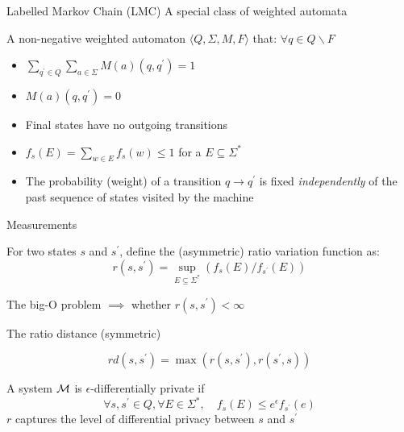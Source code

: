 \documentclass[aspectratio=169]{beamer}
\begin{document}
\begin{frame}{Labelled Markov Chain (LMC)}
    A special class of weighted automata
    \begin{definition}
        A non-negative weighted automaton $\langle Q, \Sigma,M,F\rangle$ that: $\forall q \in Q  \backslash F$
        \begin{itemize}
            \item $\sum_{q^\prime \in Q} {\sum_{a \in \Sigma}{M(a)(q,q^\prime)}} = 1$
            \item $M(a)(q,q^\prime) = 0$
        \end{itemize}
    \end{definition}
    \begin{itemize}
        \item Final states have no outgoing transitions
        \item $f_s(E) = \sum_{w \in E} f_s(w) \le 1$ for a $E \subseteq \Sigma^*$
        \item The probability (weight) of a transition $q \to q^\prime$ is fixed \textit{independently} of the past sequence of states visited by the machine
    \end{itemize}
\end{frame}

\begin{frame}{Measurements}
    \begin{block}{}
    For two states $s$ and $s^\prime$, define the (asymmetric) ratio variation function as:
    $$r(s,s^\prime) = \sup_{E \subseteq \Sigma^*} (f_s(E) / f_{s^\prime}(E))$$
\end{block}
    The big-O problem $\implies$ whether $r(s,s^\prime) < \infty$
    

\begin{block}{The ratio distance (symmetric)}

    $$rd(s,s^\prime)= \max(r(s,s^\prime),r(s^\prime,s))$$
\end{block}

    A system $\cal M$ is $\epsilon$-differentially private if
    $$\forall s,s^\prime \in Q, \forall E \in \Sigma^*, \quad f_s(E) \le e^\epsilon f_{s^\prime}(e)$$
    $r$ captures the level of differential privacy between $s$ and $s^\prime$
\end{frame}
\end{document}

